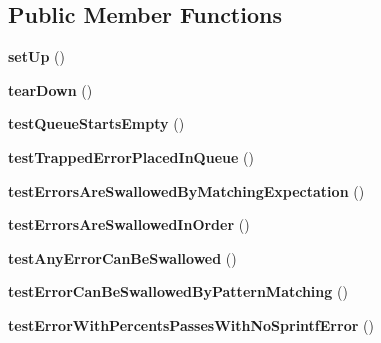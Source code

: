 \subsection*{Public Member Functions}
\begin{DoxyCompactItemize}
\item 
\hypertarget{class_test_of_error_trap_ab6cfde4cfaf735b7c11ce3f9b79d0bb9}{
{\bfseries setUp} ()}
\label{class_test_of_error_trap_ab6cfde4cfaf735b7c11ce3f9b79d0bb9}

\item 
\hypertarget{class_test_of_error_trap_acd5cd5b268c3836b78a9a80d2600d435}{
{\bfseries tearDown} ()}
\label{class_test_of_error_trap_acd5cd5b268c3836b78a9a80d2600d435}

\item 
\hypertarget{class_test_of_error_trap_ac2127d21f2f092353ff1ec2249af463c}{
{\bfseries testQueueStartsEmpty} ()}
\label{class_test_of_error_trap_ac2127d21f2f092353ff1ec2249af463c}

\item 
\hypertarget{class_test_of_error_trap_a510ea543554fc262dc0428ad93062364}{
{\bfseries testTrappedErrorPlacedInQueue} ()}
\label{class_test_of_error_trap_a510ea543554fc262dc0428ad93062364}

\item 
\hypertarget{class_test_of_error_trap_a59560b544680104fb9b979691685185f}{
{\bfseries testErrorsAreSwallowedByMatchingExpectation} ()}
\label{class_test_of_error_trap_a59560b544680104fb9b979691685185f}

\item 
\hypertarget{class_test_of_error_trap_abbb0708b0d48d5455f3714076983f3f9}{
{\bfseries testErrorsAreSwallowedInOrder} ()}
\label{class_test_of_error_trap_abbb0708b0d48d5455f3714076983f3f9}

\item 
\hypertarget{class_test_of_error_trap_af7dd756e429ad1a5178186ab9acd91ad}{
{\bfseries testAnyErrorCanBeSwallowed} ()}
\label{class_test_of_error_trap_af7dd756e429ad1a5178186ab9acd91ad}

\item 
\hypertarget{class_test_of_error_trap_ad442ab68e9381157f60a01a24a027a3b}{
{\bfseries testErrorCanBeSwallowedByPatternMatching} ()}
\label{class_test_of_error_trap_ad442ab68e9381157f60a01a24a027a3b}

\item 
\hypertarget{class_test_of_error_trap_affd116b1ddb5e78b941ad94be0319b0f}{
{\bfseries testErrorWithPercentsPassesWithNoSprintfError} ()}
\label{class_test_of_error_trap_affd116b1ddb5e78b941ad94be0319b0f}

\end{DoxyCompactItemize}
